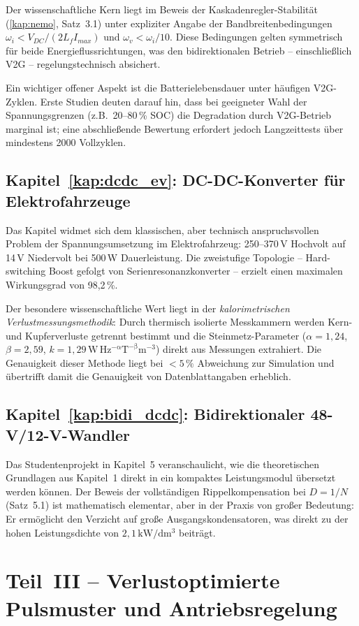 ﻿\documentclass[a4paper,12pt,openany,oneside]{book}
\newcommand{\abschnitt}[1]{\section{#1}}
\newcommand{\unterabschnitt}[1]{\subsection{#1}}
\theoremstyle{definition}
\begin{document}
Der wissenschaftliche Kern liegt im Beweis der Kaskadenregler-Stabilit\"at
(\autoref{kap:nemo}, Satz~3.1) unter expliziter Angabe der Bandbreitenbedingungen
$\omega_i < V_{DC}/(2L_f I_{max})$ und $\omega_v < \omega_i/10$. Diese Bedingungen
gelten symmetrisch f\"ur beide Energieflussrichtungen, was den bidirektionalen Betrieb
-- einschlie\ss{}lich V2G -- regelungstechnisch absichert.

Ein wichtiger offener Aspekt ist die Batterielebensdauer unter h\"aufigen V2G-Zyklen.
Erste Studien deuten darauf hin, dass bei geeigneter Wahl der Spannungsgrenzen (z.B.\
20--80\,\% SOC) die Degradation durch V2G-Betrieb marginal ist; eine abschlie\ss{}ende
Bewertung erfordert jedoch Langzeittests \"uber mindestens 2000 Vollzyklen.

\unterabschnitt{Kapitel~\ref{kap:dcdc_ev}: DC-DC-Konverter f\"ur Elektrofahrzeuge}

Das Kapitel widmet sich dem klassischen, aber technisch anspruchsvollen Problem der
Spannungsumsetzung im Elektrofahrzeug: 250--370\,V Hochvolt auf 14\,V Niedervolt bei
500\,W Dauerleistung. Die zweistufige Topologie -- Hard-switching Boost gefolgt von
Serienresonanzkonverter -- erzielt einen maximalen Wirkungsgrad von 98{,}2\,\%.

Der besondere wissenschaftliche Wert liegt in der \emph{kalorimetrischen
Verlustmessungsmethodik}: Durch thermisch isolierte Messkammern werden Kern- und
Kupferverluste getrennt bestimmt und die Steinmetz-Parameter
($\alpha = 1{,}24$, $\beta = 2{,}59$, $k = 1{,}29\,\mathrm{W\,Hz^{-\alpha}T^{-\beta}m^{-3}}$)
direkt aus Messungen extrahiert. Die Genauigkeit dieser Methode liegt bei $< 5\,\%$
Abweichung zur Simulation und \"ubertrifft damit die Genauigkeit von Datenblattangaben
erheblich.

\unterabschnitt{Kapitel~\ref{kap:bidi_dcdc}: Bidirektionaler 48-V/12-V-Wandler}

Das Studentenprojekt in Kapitel~5 veranschaulicht, wie die theoretischen Grundlagen
aus Kapitel~1 direkt in ein kompaktes Leistungsmodul \"ubersetzt werden k\"onnen.
Der Beweis der vollst\"andigen Rippelkompensation bei $D = 1/N$ (Satz~5.1) ist
mathematisch elementar, aber in der Praxis von gro\ss{}er Bedeutung: Er erm\"oglicht
den Verzicht auf gro\ss{}e Ausgangskondensatoren, was direkt zu der hohen Leistungsdichte
von $2{,}1\,\mathrm{kW/dm^3}$ beitr\"agt.

\abschnitt{Teil~III -- Verlustoptimierte Pulsmuster und Antriebsregelung}
\end{document}
